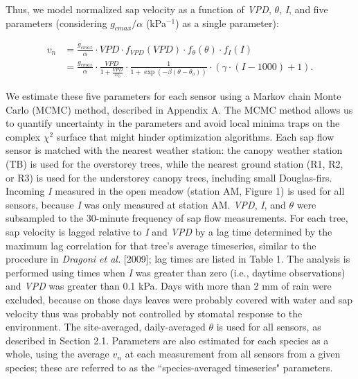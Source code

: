 Thus, we model normalized sap velocity as a function of \textit{VPD}, $\theta$, \textit{I}, and five parameters (considering $g_{cmax}/\alpha$ (kPa$^{-1}$) as a single parameter):

\begin{align}
v_n & =  \frac{g_{cmax}}{\alpha} \cdot VPD \cdot f_{VPD}(VPD) \cdot f_{\theta}(\theta) \cdot f_I(I) \nonumber \\ 
& =  \frac{g_{cmax}}{\alpha} \cdot \frac{VPD}{1+\frac{VPD}{D_o}} \cdot \frac{1}{1+\exp(-\beta(\theta-\theta_o))} \cdot (\gamma \cdot (I-1000)+1).
\end{align}

We estimate these five parameters for each sensor using a Markov chain Monte Carlo (MCMC) method, described in Appendix A.  The MCMC method allows us to quantify uncertainty in the parameters and avoid local minima traps on the complex $\chi ^2$ surface that might hinder optimization algorithms.  Each sap flow sensor is matched with the nearest weather station: the canopy weather station (TB) is used for the overstorey trees, while the nearest ground station (R1, R2, or R3) is used for the understorey canopy trees, including small Douglas-firs.  Incoming \textit{I} measured in the open meadow (station AM, Figure 1) is used for all sensors, because \textit{I} was only measured at station AM.  \textit{VPD}, \textit{I}, and $\theta$ were subsampled to the 30-minute frequency of sap flow measurements.  For each tree, sap velocity is lagged relative to \textit{I} and \textit{VPD} by a lag time determined by the maximum lag correlation for that tree's average timeseries, similar to the procedure in \textit{Dragoni et al.} [2009]; lag times are listed in Table 1.  The analysis is performed using times when \textit{I} was greater than zero (i.e., daytime observations) and \textit{VPD} was greater than 0.1 kPa.  Days with more than 2 mm of rain were excluded, because on those days leaves were probably covered with water and sap velocity thus was probably not controlled by stomatal response to the environment.  The site-averaged, daily-averaged $\theta$ is used for all sensors, as described in Section 2.1.  Parameters are also estimated for each species as a whole, using the average $v_n$ at each measurement from all sensors from a given species; these are referred to as the ``species-averaged timeseries" parameters.


